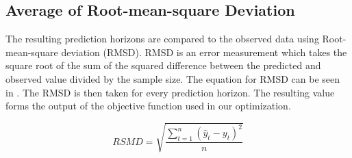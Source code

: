 \subsection{Average of Root-mean-square Deviation}
The resulting prediction horizons are compared to the observed data using Root-mean-square deviation (RMSD). RMSD is an error measurement which takes the square root of the sum of the squared difference between the predicted and observed value divided by the sample size. The equation for RMSD can be seen in . The RMSD is then taken for every prediction horizon. The resulting value forms the output of the objective function used in our optimization.

\begin{equation}
\label{eq:rmsd}
RSMD = \sqrt{\frac{\sum_{t=1}^n (\hat{y}_t - y_t) ^ 2}{n}}
\end{equation}